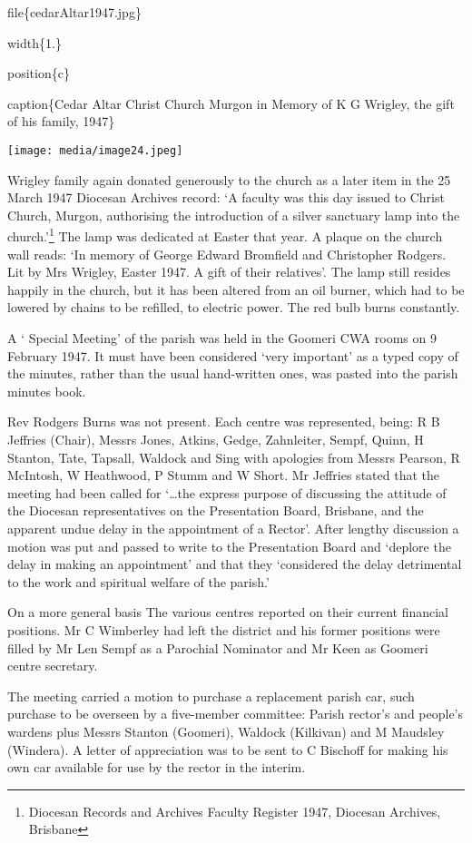 file\{cedarAltar1947.jpg\}

width\{1.\}

position\{c\}

caption\{Cedar Altar Christ Church Murgon in Memory of K G Wrigley, the gift of his family, 1947\}

\texttt{[image: media/image24.jpeg]}

Wrigley family again donated generously to the church as a later item in the 25 March 1947 Diocesan Archives record: `A faculty was this day issued to Christ Church, Murgon, authorising the introduction of a silver sanctuary lamp into the church.'\footnote{Diocesan Records and Archives Faculty Register 1947, Diocesan Archives, Brisbane} The lamp was dedicated at Easter that year. A plaque on the church wall reads: `In memory of George Edward Bromfield and Christopher Rodgers. Lit by Mrs Wrigley, Easter 1947. A gift of their relatives'. The lamp still resides happily in the church, but it has been altered from an oil burner, which had to be lowered by chains to be refilled, to electric power. The red bulb burns constantly.

A ` Special Meeting' of the parish was held in the Goomeri CWA rooms on 9 February 1947. It must have been considered `very important' as a typed copy of the minutes, rather than the usual hand-written ones, was pasted into the parish minutes book.

Rev Rodgers Burns was not present. Each centre was represented, being: R B Jeffries (Chair), Messrs Jones, Atkins, Gedge, Zahnleiter, Sempf, Quinn, H Stanton, Tate, Tapsall, Waldock and Sing with apologies from Messrs Pearson, R McIntosh, W Heathwood, P Stumm and W Short. Mr Jeffries stated that the meeting had been called for `\ldots the express purpose of discussing the attitude of the Diocesan representatives on the Presentation Board, Brisbane, and the apparent undue delay in the appointment of a Rector'. After lengthy discussion a motion was put and passed to write to the Presentation Board and `deplore the delay in making an appointment' and that they `considered the delay detrimental to the work and spiritual welfare of the parish.'

On a more general basis The various centres reported on their current financial positions. Mr C Wimberley had left the district and his former positions were filled by Mr Len Sempf as a Parochial Nominator and Mr Keen as Goomeri centre secretary.

The meeting carried a motion to purchase a replacement parish car, such purchase to be overseen by a five-member committee: Parish rector's and people's wardens plus Messrs Stanton (Goomeri), Waldock (Kilkivan) and M Maudsley (Windera). A letter of appreciation was to be sent to C Bischoff for making his own car available for use by the rector in the interim.

